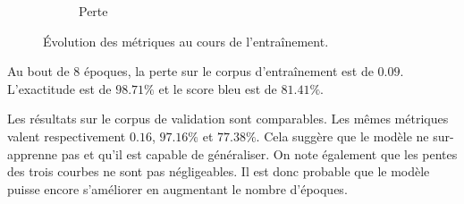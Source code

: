\begin{figure}[hbt]
\begin{subfigure}{.5\textwidth}
\begin{center}
        \end{center}
        \caption{Perte}
        \label{fig.results.training.loss}
    \end{subfigure}
    \caption{Évolution des métriques au cours de l'entraînement.}
    \label{fig.results.training}
\end{figure}
Au bout de 8 époques, la perte sur le corpus d'entraînement est de \(0.09\).
L'exactitude est de \(98.71\%\) et le score \gls{bleu} est de \(81.41\%\).

Les résultats sur le corpus de validation sont comparables.
Les mêmes métriques valent respectivement \(0.16\), \(97.16\%\) et \(77.38\%\).
Cela suggère que le modèle ne sur-apprenne pas et qu'il est capable de généraliser.
On note également que les pentes des trois courbes ne sont pas négligeables.
Il est donc probable que le modèle puisse encore s'améliorer en augmentant le nombre d'époques.